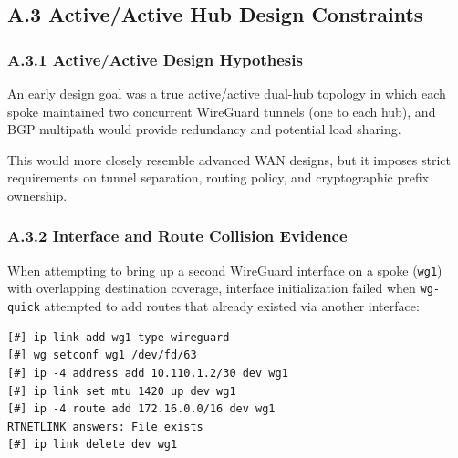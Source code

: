 \documentclass[11pt]{article}
\begin{document}
%
%
%
%
\subsection{A.3 Active/Active Hub Design Constraints}
\label{subsec:a3-active-active-constraints}

\subsubsection{A.3.1 Active/Active Design Hypothesis}
\label{subsubsec:a3-hypothesis}

An early design goal was a true active/active dual-hub topology in which each spoke maintained two concurrent WireGuard tunnels (one to each hub), and BGP multipath would provide redundancy and potential load sharing.

This would more closely resemble advanced WAN designs, but it imposes strict requirements on tunnel separation, routing policy, and cryptographic prefix ownership.

\subsubsection{A.3.2 Interface and Route Collision Evidence}
\label{subsubsec:a3-collision-evidence}

When attempting to bring up a second WireGuard interface on a spoke (\texttt{wg1}) with overlapping destination coverage, interface initialization failed when \texttt{wg-quick} attempted to add routes that already existed via another interface:

\begin{verbatim}
[#] ip link add wg1 type wireguard
[#] wg setconf wg1 /dev/fd/63
[#] ip -4 address add 10.110.1.2/30 dev wg1
[#] ip link set mtu 1420 up dev wg1
[#] ip -4 route add 172.16.0.0/16 dev wg1
RTNETLINK answers: File exists
[#] ip link delete dev wg1
\end{verbatim}
\end{document}
